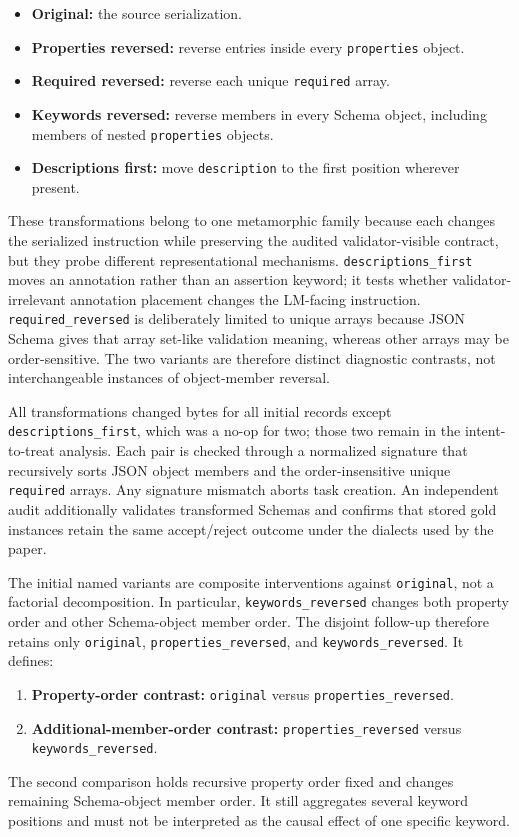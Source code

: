 \documentclass[11pt,a4paper]{article}
\begin{document}
\begin{itemize}
\item \textbf{Original:} the source serialization.
\item \textbf{Properties reversed:} reverse entries inside every \texttt{properties} object.
\item \textbf{Required reversed:} reverse each unique \texttt{required} array.
\item \textbf{Keywords reversed:} reverse members in every Schema object, including members of nested \texttt{properties} objects.
\item \textbf{Descriptions first:} move \texttt{description} to the first position wherever present.
\end{itemize}
These transformations belong to one metamorphic family because each changes the serialized instruction while preserving the audited validator-visible contract, but they probe different representational mechanisms. \texttt{descriptions\_first} moves an annotation rather than an assertion keyword; it tests whether validator-irrelevant annotation placement changes the LM-facing instruction. \texttt{required\_reversed} is deliberately limited to unique arrays because JSON Schema gives that array set-like validation meaning, whereas other arrays may be order-sensitive. The two variants are therefore distinct diagnostic contrasts, not interchangeable instances of object-member reversal.

All transformations changed bytes for all initial records except \texttt{descriptions\_first}, which was a no-op for two; those two remain in the intent-to-treat analysis. Each pair is checked through a normalized signature that recursively sorts JSON object members and the order-insensitive unique \texttt{required} arrays. Any signature mismatch aborts task creation. An independent audit additionally validates transformed Schemas and confirms that stored gold instances retain the same accept/reject outcome under the dialects used by the paper.

The initial named variants are composite interventions against \texttt{original}, not a factorial decomposition. In particular, \texttt{keywords\_reversed} changes both property order and other Schema-object member order. The disjoint follow-up therefore retains only \texttt{original}, \texttt{properties\_reversed}, and \texttt{keywords\_reversed}. It defines:

\begin{enumerate}
\item \textbf{Property-order contrast:} \texttt{original} versus \texttt{properties\_reversed}.
\item \textbf{Additional-member-order contrast:} \texttt{properties\_reversed} versus \texttt{keywords\_reversed}.
\end{enumerate}
The second comparison holds recursive property order fixed and changes remaining Schema-object member order. It still aggregates several keyword positions and must not be interpreted as the causal effect of one specific keyword.
\end{document}
